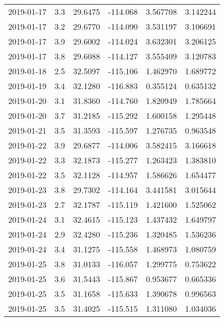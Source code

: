 \begin{tabular}{lrrrrr}
2019-01-17 &       3.3 &  29.6475 &  -114.068 &         3.567708 &         3.142244 \\
2019-01-17 &       3.2 &  29.6770 &  -114.090 &         3.531197 &         3.106691 \\
2019-01-17 &       3.9 &  29.6002 &  -114.024 &         3.632301 &         3.206125 \\
2019-01-17 &       3.8 &  29.6088 &  -114.127 &         3.555409 &         3.120783 \\
2019-01-18 &       2.5 &  32.5097 &  -115.106 &         1.462970 &         1.689772 \\
2019-01-19 &       3.4 &  32.1280 &  -116.883 &         0.355124 &         0.635132 \\
2019-01-20 &       3.1 &  31.8360 &  -114.760 &         1.820949 &         1.785664 \\
2019-01-20 &       3.7 &  31.2185 &  -115.292 &         1.600158 &         1.295448 \\
2019-01-21 &       3.5 &  31.3593 &  -115.597 &         1.276735 &         0.963548 \\
2019-01-22 &       3.9 &  29.6877 &  -114.006 &         3.582415 &         3.166618 \\
2019-01-22 &       3.3 &  32.1873 &  -115.277 &         1.263423 &         1.383810 \\
2019-01-22 &       3.5 &  32.1128 &  -114.957 &         1.586626 &         1.654477 \\
2019-01-23 &       3.8 &  29.7302 &  -114.164 &         3.441581 &         3.015644 \\
2019-01-23 &       2.7 &  32.1787 &  -115.119 &         1.421600 &         1.525062 \\
2019-01-24 &       3.1 &  32.4615 &  -115.123 &         1.437432 &         1.649797 \\
2019-01-24 &       2.9 &  32.4280 &  -115.236 &         1.320485 &         1.536236 \\
2019-01-24 &       3.4 &  31.1275 &  -115.558 &         1.468973 &         1.080759 \\
2019-01-25 &       3.8 &  31.0133 &  -116.057 &         1.299775 &         0.753622 \\
2019-01-25 &       3.6 &  31.5443 &  -115.867 &         0.953677 &         0.665336 \\
2019-01-25 &       3.5 &  31.1658 &  -115.633 &         1.390678 &         0.996563 \\
2019-01-25 &       3.5 &  31.4025 &  -115.515 &         1.311080 &         1.034036 \\

\end{tabular}
